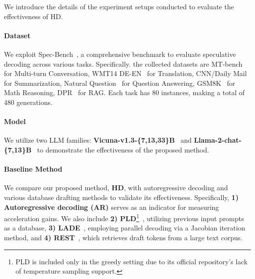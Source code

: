 \label{sec:experiement}
We introduce the details of the experiment setups conducted to evaluate the effectiveness of HD.

\paragraph{Dataset} 
We exploit Spec-Bench~\cite{Spec_Survey}, a comprehensive benchmark to evaluate speculative decoding across various tasks. Specifically. the collected datasets are MT-bench~\cite{vicuna} for Multi-turn Conversation, WMT14 DE-EN~\cite{translation} for Translation, CNN/Daily Mail~\cite{summarization} for Summarization, Natural Question~\cite{QA} for Question Answering, GSM8K~\cite{math} for Math Reasoning, DPR~\cite{RAG} for RAG. Each task has 80 instances, making a total of 480 generations.

\paragraph{Model}
We utilize two LLM families: \textbf{Vicuna-v1.3-\{7,13,33\}B}~\cite{vicuna} and \textbf{Llama-2-chat-\{7,13\}B}~\cite{Llama2} to demonstrate the effectiveness of the proposed method. 



\paragraph{Baseline Method}
We compare our proposed method, \textbf{HD}, with autoregressive decoding and various database drafting methods to validate its effectiveness. Specifically, \textbf{1) Autoregressive decoding (AR)} serves as an indicator for measuring acceleration gains. We also include \textbf{2) PLD}\footnote{PLD is included only in the greedy setting due to its official repository's lack of temperature sampling support.}~\cite{PLD}, utilizing previous input prompts as a database, \textbf{3) LADE}~\cite{LAD}, employing parallel decoding via a Jacobian iteration method, and \textbf{4) REST}~\cite{REST}, which retrieves draft tokens from a large text corpus. 

